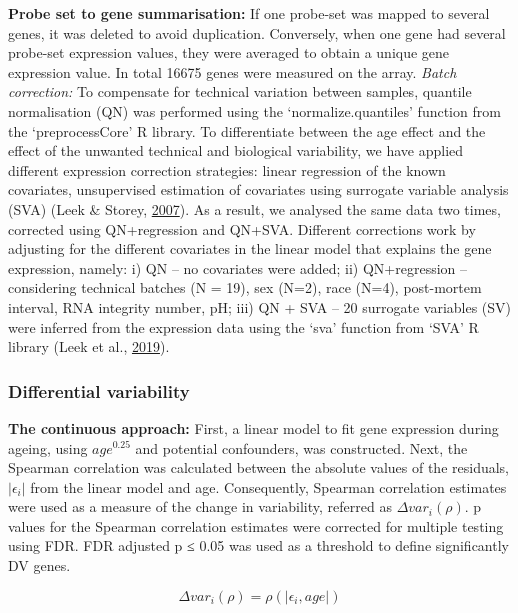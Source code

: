 \documentclass[12pt,twoside]{unicam}
\begin{document}
\textbf{Probe set to gene summarisation:} If one probe-set was mapped to several genes, it was deleted to avoid duplication. Conversely, when one gene had several probe-set expression values, they were averaged to obtain a unique gene expression value. In total 16675 genes were measured on the array.
\emph{Batch correction:} To compensate for technical variation between samples, quantile normalisation (QN) was performed using the `normalize.quantiles' function from the `preprocessCore' R library. To differentiate between the age effect and the effect of the unwanted technical and biological variability, we have applied different expression correction strategies: linear regression of the known covariates, unsupervised estimation of covariates using surrogate variable analysis (SVA) (Leek \& Storey, \protect\hyperlink{ref-Leek2007}{2007}). As a result, we analysed the same data two times, corrected using QN+regression and QN+SVA. Different corrections work by adjusting for the different covariates in the linear model that explains the gene expression, namely: i) QN -- no covariates were added; ii) QN+regression -- considering technical batches (N = 19), sex (N=2), race (N=4), post-mortem interval, RNA integrity number, pH; iii) QN + SVA -- 20 surrogate variables (SV) were inferred from the expression data using the `sva' function from `SVA' R library (Leek et al., \protect\hyperlink{ref-svapack}{2019}).

\hypertarget{differential-variability}{%
\subsubsection{Differential variability}\label{differential-variability}}

\textbf{The continuous approach:} First, a linear model to fit gene expression during ageing, using \(age^{0.25}\) and potential confounders, was constructed. Next, the Spearman correlation was calculated between the absolute values of the residuals, \(|\epsilon_i|\) from the linear model and age. Consequently, Spearman correlation estimates were used as a measure of the change in variability, referred as \(\Delta var_i(\rho)\). p values for the Spearman correlation estimates were corrected for multiple testing using FDR. FDR adjusted p ≤ 0.05 was used as a threshold to define significantly DV genes.

\[\Delta var_i(\rho)=\rho(|\epsilon_i,age|)\]
\end{document}
